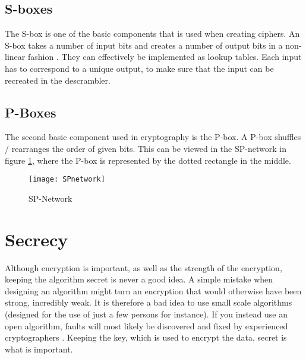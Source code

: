 \subsection{S-boxes}
The S-box is one of the basic components that is used when creating 
ciphers. An S-box takes a number of input bits and creates a number of 
output bits in a non-linear fashion \citep[pp. 74--75]{Stinson:2006}. 
They can effectively be implemented as lookup tables. Each input has to 
correspond to a unique output, to make sure that the input can be 
recreated in the descrambler.


\subsection{P-Boxes}
The second basic component used in cryptography is the P-box. A P-box 
shuffles / rearranges the order of given bits. This can be viewed in 
the SP-network in figure \ref{img:SPNetwork}, where the P-box is 
represented by the dotted rectangle in the middle.

\begin{figure}
  \begin{center}
    \texttt{[image: SPnetwork]}
    \caption{SP-Network}
    \label{img:SPNetwork}
  \end{center}
\end{figure}


\section{Secrecy}
Although encryption is important, as well as the strength of the 
encryption, keeping the algorithm secret is never a good idea. A simple 
mistake when designing an algorithm might turn an encryption that would 
otherwise have been strong, incredibly weak. It is therefore a bad 
idea to use small scale algorithms (designed for the use of just a few 
persons for instance). If you instead use an open algorithm, faults 
will most likely be discovered and fixed by experienced cryptographers 
\citep[pp. 23]{Schneier:2003}. Keeping the key, which is used to 
encrypt the data, secret is what is important.
